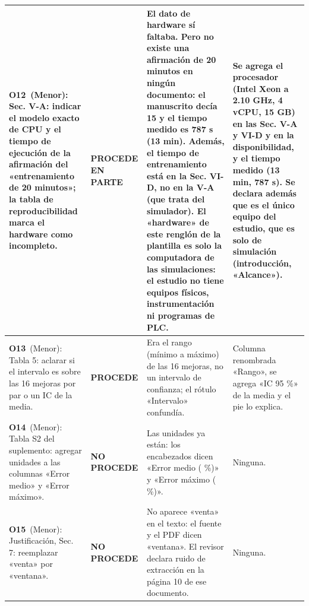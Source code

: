 \begin{longtable}{@{}p{7.4cm}p{2.1cm}p{8.4cm}p{7.3cm}@{}}
\midrule
\textbf{O12}\ (Menor): Sec. V-A: indicar el modelo exacto de CPU y el tiempo de ejecución de la afirmación del «entrenamiento de 20 minutos»; la tabla de reproducibilidad marca el hardware como incompleto.\par\smallskip{\itshape Ubicaci\'on citada: Sec. V-A; Parte 4B ítem 7} & \cellcolor{okamarillo}\textbf{PROCEDE EN PARTE} & El dato de hardware sí faltaba. Pero no existe una afirmación de 20 minutos en ningún documento: el manuscrito decía 15 y el tiempo medido es 787 s (13 min). Además, el tiempo de entrenamiento está en la Sec. VI-D, no en la V-A (que trata del simulador). El «hardware» de este renglón de la plantilla es solo la computadora de las simulaciones: el estudio no tiene equipos físicos, instrumentación ni programas de PLC. & Se agrega el procesador (Intel Xeon a 2.10 GHz, 4 vCPU, 15 GB) en las Sec. V-A y VI-D y en la disponibilidad, y el tiempo medido (13 min, 787 s). Se declara además que es el único equipo del estudio, que es solo de simulación (introducción, «Alcance»).\par\smallskip{\itshape Queda en: Sec. V-A (p. 5); Sec. VI-D (p. 7); «Disponibilidad del código» (p. 10); Sec. I (p. 1)} \\
\midrule
\textbf{O13}\ (Menor): Tabla 5: aclarar si el intervalo es sobre las 16 mejoras por par o un IC de la media.\par\smallskip{\itshape Ubicaci\'on citada: Tabla 5} & \cellcolor{okverde}\textbf{PROCEDE} & Era el rango (mínimo a máximo) de las 16 mejoras, no un intervalo de confianza; el rótulo «Intervalo» confundía. & Columna renombrada «Rango», se agrega «IC 95 \%» de la media y el pie lo explica.\par\smallskip{\itshape Queda en: Tabla 5 (p. 10)} \\
\midrule
\textbf{O14}\ (Menor): Tabla S2 del suplemento: agregar unidades a las columnas «Error medio» y «Error máximo».\par\smallskip{\itshape Ubicaci\'on citada: Suplemento, Tabla S2} & \cellcolor{okrojo}\textbf{NO PROCEDE} & Las unidades ya están: los encabezados dicen «Error medio ( \%)» y «Error máximo ( \%)». & Ninguna.\par\smallskip{\itshape Queda en: Tabla S2 del suplemento (p. 3)} \\
\midrule
\textbf{O15}\ (Menor): Justificación, Sec. 7: reemplazar «venta» por «ventana».\par\smallskip{\itshape Ubicaci\'on citada: Justificación, Sec. 7} & \cellcolor{okrojo}\textbf{NO PROCEDE} & No aparece «venta» en el texto: el fuente y el PDF dicen «ventana». El revisor declara ruido de extracción en la página 10 de ese documento. & Ninguna.\par\smallskip{\itshape Queda en: sin cambios} \\

\end{longtable}

